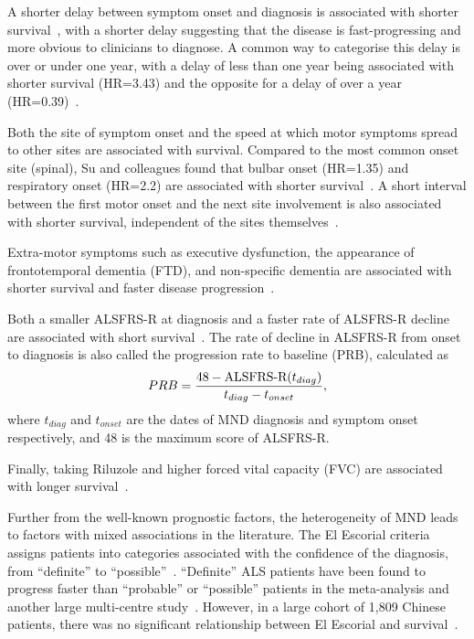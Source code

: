 A shorter delay between symptom onset and diagnosis is associated with shorter survival~\cite{suPredictorsSurvivalPatients2021}, with a shorter delay suggesting that the disease is fast-progressing and more obvious to clinicians to diagnose.
A common way to categorise this delay is over or under one year, with a delay of less than one year being associated with shorter survival (HR=3.43) and the opposite for a delay of over a year (HR=0.39)~\cite{suPredictorsSurvivalPatients2021, gaoEpidemiologyFactorsPredicting2021}.


Both the site of symptom onset and the speed at which motor symptoms spread to other sites are associated with survival.
Compared to the most common onset site (spinal), Su and colleagues found that bulbar onset (HR=1.35) and respiratory onset (HR=2.2) are associated with shorter survival~\cite{suPredictorsSurvivalPatients2021}.
A short interval between the first motor onset and the next site involvement is also associated with shorter survival, independent of the sites themselves~\cite{fujimura-kiyonoOnsetSpreadingPatterns2011a}.

Extra-motor symptoms such as executive dysfunction, the appearance of frontotemporal dementia (FTD), and non-specific dementia are associated with shorter survival and faster disease progression~\cite{suPredictorsSurvivalPatients2021, elaminExecutiveDysfunctionNegative2011}.

Both a smaller ALSFRS-R at diagnosis and a faster rate of ALSFRS-R decline are associated with short survival~\cite{suPredictorsSurvivalPatients2021}.
The rate of decline in ALSFRS-R from onset to diagnosis is also called the progression rate to baseline (PRB), calculated as
\begin{equation}
    PRB = \frac{48-\textnormal{ALSFRS-R}(t_{diag})}{t_{diag}-t_{onset}},
\end{equation}\label{eq:PRB}
where $t_{diag}$ and $t_{onset}$ are the dates of MND diagnosis and symptom onset respectively, and 48 is the maximum score of ALSFRS-R.

Finally, taking Riluzole and higher forced vital capacity (FVC) are associated with longer survival~\cite{suPredictorsSurvivalPatients2021}.

Further from the well-known prognostic factors, the heterogeneity of MND leads to factors with mixed associations in the literature.
The El Escorial criteria assigns patients into categories associated with the confidence of the diagnosis, from ``definite'' to ``possible''~\cite{ludolphRevisionEscorialCriteria2015}.
``Definite'' ALS patients have been found to progress faster than ``probable'' or ``possible'' patients in the meta-analysis and another large multi-centre study~\cite{suPredictorsSurvivalPatients2021, westenengPrognosisPatientsAmyotrophic2018}.
However, in a large cohort of 1,809 Chinese patients, there was no significant relationship between El Escorial and survival~\cite{gaoEpidemiologyFactorsPredicting2021}.

